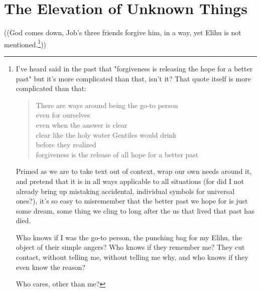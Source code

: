 \section*{The Elevation of Unknown Things}

((God comes down, Job's three friends forgive him, in a way, yet Elihu is not mentioned.\footnote{I've heard said in the past that "forgiveness is releasing the hope for a better past" \parencite{wakefield} but it's more complicated than that, isn't it? That quote itself is more complicated than that:

\begin{verse}
There are ways around being the go-to person \\
even for ourselves \\
even when the answer is clear \\
clear like the holy water Gentiles would drink \\
before they realized \\
forgiveness is the release of all hope for a better past
\end{verse}

Primed as we are to take text out of context, wrap our own needs around it, and pretend that it is in all ways applicable to all situations (for did I not already bring up mistaking accidental, individual symbols for universal ones?), it's so easy to misremember that the better past we hope for is just some dream, some thing we cling to long after the us that lived that past has died.

Who knows if I was the go-to person, the punching bag for my Elihu, the object of their simple angers? Who knows if they remember me? They cut contact, without telling me, without telling me why, and who knows if they even know the reason?

Who cares, other than me?}))
\nocite{eeaao}
